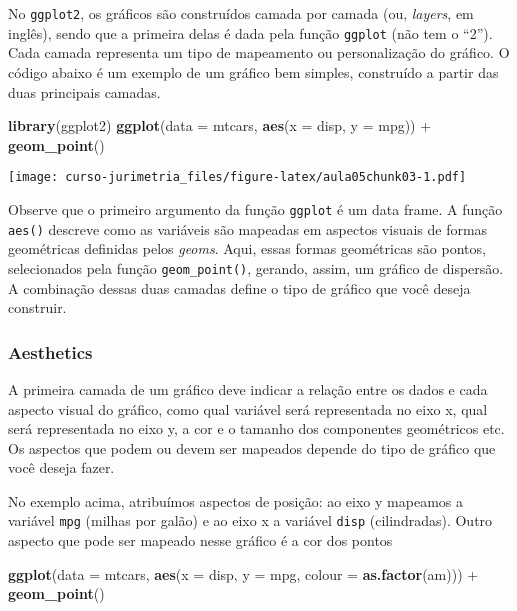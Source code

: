\documentclass[]{book}
\newenvironment{Shaded}{\begin{snugshade}}{\end{snugshade}}
\newcommand{\KeywordTok}[1]{\textcolor[rgb]{0.13,0.29,0.53}{\textbf{{#1}}}}
\newcommand{\DataTypeTok}[1]{\textcolor[rgb]{0.13,0.29,0.53}{{#1}}}
\newcommand{\StringTok}[1]{\textcolor[rgb]{0.31,0.60,0.02}{{#1}}}
\newcommand{\NormalTok}[1]{{#1}}
\begin{document}
No \texttt{ggplot2}, os gráficos são construídos camada por camada (ou,
\emph{layers}, em inglês), sendo que a primeira delas é dada pela função
\texttt{ggplot} (não tem o ``2''). Cada camada representa um tipo de
mapeamento ou personalização do gráfico. O código abaixo é um exemplo de
um gráfico bem simples, construído a partir das duas principais camadas.

\begin{Shaded}
\begin{Highlighting}[]
\KeywordTok{library}\NormalTok{(ggplot2)}
\KeywordTok{ggplot}\NormalTok{(}\DataTypeTok{data =} \NormalTok{mtcars, }\KeywordTok{aes}\NormalTok{(}\DataTypeTok{x =} \NormalTok{disp, }\DataTypeTok{y =} \NormalTok{mpg)) +}\StringTok{ }
\StringTok{  }\KeywordTok{geom_point}\NormalTok{()}
\end{Highlighting}
\end{Shaded}

\texttt{[image: curso-jurimetria\_files/figure-latex/aula05chunk03-1.pdf]}

Observe que o primeiro argumento da função \texttt{ggplot} é um data
frame. A função \texttt{aes()} descreve como as variáveis são mapeadas
em aspectos visuais de formas geométricas definidas pelos \emph{geoms}.
Aqui, essas formas geométricas são pontos, selecionados pela função
\texttt{geom\_point()}, gerando, assim, um gráfico de dispersão. A
combinação dessas duas camadas define o tipo de gráfico que você deseja
construir.

\subsubsection{Aesthetics}\label{aesthetics}

A primeira camada de um gráfico deve indicar a relação entre os dados e
cada aspecto visual do gráfico, como qual variável será representada no
eixo x, qual será representada no eixo y, a cor e o tamanho dos
componentes geométricos etc. Os aspectos que podem ou devem ser mapeados
depende do tipo de gráfico que você deseja fazer.

No exemplo acima, atribuímos aspectos de posição: ao eixo y mapeamos a
variável \texttt{mpg} (milhas por galão) e ao eixo x a variável
\texttt{disp} (cilindradas). Outro aspecto que pode ser mapeado nesse
gráfico é a cor dos pontos

\begin{Shaded}
\begin{Highlighting}[]
\KeywordTok{ggplot}\NormalTok{(}\DataTypeTok{data =} \NormalTok{mtcars, }\KeywordTok{aes}\NormalTok{(}\DataTypeTok{x =} \NormalTok{disp, }\DataTypeTok{y =} \NormalTok{mpg, }\DataTypeTok{colour =} \KeywordTok{as.factor}\NormalTok{(am))) +}\StringTok{ }
\StringTok{  }\KeywordTok{geom_point}\NormalTok{()}
\end{Highlighting}
\end{Shaded}
\end{document}
